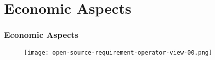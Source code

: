 \section{Economic Aspects}

\begin{frame}[allowframebreaks]
\frametitle{Economic Aspects}

\begin{center}
  \begin{figure}
    \texttt{[image: open-source-requirement-operator-view-00.png]}
  \end{figure}
\end{center}

\end{frame}
